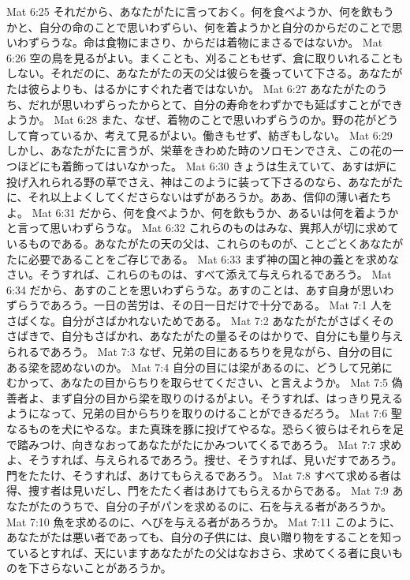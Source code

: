 Mat 6:25  それだから、あなたがたに言っておく。何を食べようか、何を飲もうかと、自分の命のことで思いわずらい、何を着ようかと自分のからだのことで思いわずらうな。命は食物にまさり、からだは着物にまさるではないか。
Mat 6:26  空の鳥を見るがよい。まくことも、刈ることもせず、倉に取りいれることもしない。それだのに、あなたがたの天の父は彼らを養っていて下さる。あなたがたは彼らよりも、はるかにすぐれた者ではないか。
Mat 6:27  あなたがたのうち、だれが思いわずらったからとて、自分の寿命をわずかでも延ばすことができようか。
Mat 6:28  また、なぜ、着物のことで思いわずらうのか。野の花がどうして育っているか、考えて見るがよい。働きもせず、紡ぎもしない。
Mat 6:29  しかし、あなたがたに言うが、栄華をきわめた時のソロモンでさえ、この花の一つほどにも着飾ってはいなかった。
Mat 6:30  きょうは生えていて、あすは炉に投げ入れられる野の草でさえ、神はこのように装って下さるのなら、あなたがたに、それ以上よくしてくださらないはずがあろうか。ああ、信仰の薄い者たちよ。
Mat 6:31  だから、何を食べようか、何を飲もうか、あるいは何を着ようかと言って思いわずらうな。
Mat 6:32  これらのものはみな、異邦人が切に求めているものである。あなたがたの天の父は、これらのものが、ことごとくあなたがたに必要であることをご存じである。
Mat 6:33  まず神の国と神の義とを求めなさい。そうすれば、これらのものは、すべて添えて与えられるであろう。
Mat 6:34  だから、あすのことを思いわずらうな。あすのことは、あす自身が思いわずらうであろう。一日の苦労は、その日一日だけで十分である。
Mat 7:1  人をさばくな。自分がさばかれないためである。
Mat 7:2  あなたがたがさばくそのさばきで、自分もさばかれ、あなたがたの量るそのはかりで、自分にも量り与えられるであろう。
Mat 7:3  なぜ、兄弟の目にあるちりを見ながら、自分の目にある梁を認めないのか。
Mat 7:4  自分の目には梁があるのに、どうして兄弟にむかって、あなたの目からちりを取らせてください、と言えようか。
Mat 7:5  偽善者よ、まず自分の目から梁を取りのけるがよい。そうすれば、はっきり見えるようになって、兄弟の目からちりを取りのけることができるだろう。
Mat 7:6  聖なるものを犬にやるな。また真珠を豚に投げてやるな。恐らく彼らはそれらを足で踏みつけ、向きなおってあなたがたにかみついてくるであろう。
Mat 7:7  求めよ、そうすれば、与えられるであろう。捜せ、そうすれば、見いだすであろう。門をたたけ、そうすれば、あけてもらえるであろう。
Mat 7:8  すべて求める者は得、捜す者は見いだし、門をたたく者はあけてもらえるからである。
Mat 7:9  あなたがたのうちで、自分の子がパンを求めるのに、石を与える者があろうか。
Mat 7:10  魚を求めるのに、へびを与える者があろうか。
Mat 7:11  このように、あなたがたは悪い者であっても、自分の子供には、良い贈り物をすることを知っているとすれば、天にいますあなたがたの父はなおさら、求めてくる者に良いものを下さらないことがあろうか。
